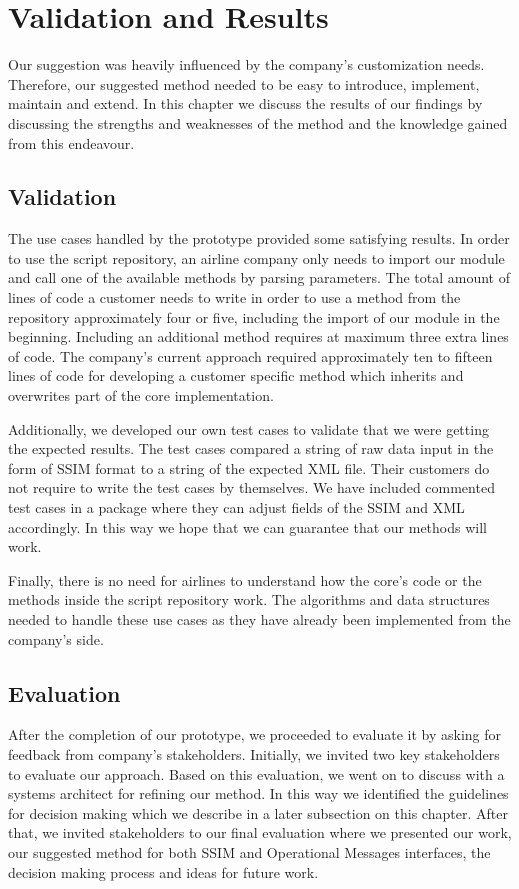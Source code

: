 \section{Validation and Results}\label{sec:results}

Our suggestion was heavily influenced by the company's customization needs. Therefore, our suggested method needed to be easy to introduce, implement, maintain and extend. In this chapter we  discuss the results of our findings by discussing the strengths and weaknesses of the method and the knowledge gained from this endeavour. 

\subsection{Validation}

The use cases handled by the prototype provided some satisfying results. In order to use the script repository, an airline company only needs to import our module and call one of the available methods by parsing parameters. The total amount of lines of code a customer needs to write in order to use a method from the repository approximately four or five, including the import of our module in the beginning. Including an additional method requires at maximum three extra lines of code.
The company's current approach required approximately ten to fifteen lines of code for developing a customer specific method which inherits and overwrites part of the core implementation.

Additionally, we developed our own test cases to validate that we were getting the expected results. The test cases compared a string of raw data input in the form of SSIM format to a string of the expected XML file. Their customers do not require to write the test cases by themselves. We have included commented test cases in a package where they can adjust fields of the SSIM and XML accordingly. In this way we hope that we can guarantee that our methods will work.

Finally, there is no need for airlines to understand how the core's code or the methods inside the script repository work. The algorithms and data structures needed to handle these use cases as they have already been implemented from the company's side.

\subsection{Evaluation}
After the completion of our prototype, we proceeded to evaluate it by asking for feedback from company's stakeholders. Initially, we invited two key stakeholders to evaluate our approach. Based on this evaluation, we went on to discuss with a systems architect for refining our method. In this way we identified the guidelines for decision making which we describe in a later subsection on this chapter. After that, we invited stakeholders to our final evaluation where we presented our work, our suggested method for both SSIM and Operational Messages interfaces, the decision making process and ideas for future work. 


